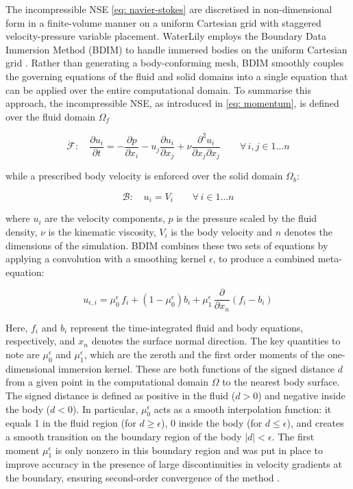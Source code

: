 The incompressible NSE \ref{eq: navier-stokes} are discretised in non-dimensional form in a finite-volume manner on a uniform Cartesian grid with staggered velocity-pressure variable placement. WaterLily employs the Boundary Data Immersion Method (BDIM) to handle immersed bodies on the uniform Cartesian grid \cite{Maertens2015}. Rather than generating a body-conforming mesh, BDIM smoothly couples the governing equations of the fluid and solid domains into a single equation that can be applied over the entire computational domain. To summarise this approach, the incompressible NSE, as introduced in \autoref{eq: momentum}, is defined over the fluid domain $\Omega_{f}$

\begin{equation}\label{eq: WaterLilyMomentum}
    \dot{\mathcal{F}}: \quad \frac{\partial u_i}{\partial t} = -\frac{\partial p}{\partial x_i} - u_j \frac{\partial u_i}{\partial x_j} + \nu \frac{\partial^2 u_i}{\partial x_j \partial x_j} \qquad \forall\, i,j \in 1\ldots n
\end{equation}

while a prescribed body velocity is enforced over the solid domain $\Omega_b$:

\begin{equation}\label{eq: WaterLilyBodyVelocity}
    \mathcal{B}: \quad u_i = V_i \qquad \forall\, i \in 1\ldots n
\end{equation}

where $u_i$ are the velocity components, $p$ is the pressure scaled by the fluid density, $\nu$ is the kinematic viscosity, $V_i$ is the body velocity and $n$ denotes the dimensions of the simulation. BDIM combines these two sets of equations by applying a convolution with a smoothing kernel $\epsilon$, to produce a combined meta-equation: 

\begin{equation}\label{eq: WaterLilyVelocity}
    u_{\epsilon, i} = \mu_0^\epsilon \, f_i + \left(1 - \mu_0^\epsilon\right) b_i 
+ \mu_1^\epsilon \, \frac{\partial}{\partial x_n}\!\left(f_i - b_i\right)
\end{equation}

Here, $f_i$ and $b_i$ represent the time-integrated fluid and body equations, respectively, and $x_n$ denotes the surface normal direction. The key quantities to note are $\mu^{\epsilon}_0$ and $\mu^{\epsilon}_1$, which are the zeroth and the first order moments of the one-dimensional immersion kernel. These are both functions of the signed distance $d$ from a given point in the computational domain $\Omega$ to the nearest body surface. The signed distance is defined as positive in the fluid ($d > 0$) and negative inside the body ($d < 0$). In particular, $\mu^{\epsilon}_0$ acts as a smooth interpolation function: it equals 1 in the fluid region (for $d \geq \epsilon$), 0 inside the body (for $d \leq \epsilon$), and creates a smooth transition on the boundary region of the body $|d| < \epsilon$. The first moment $\mu^{\epsilon}_1$ is only nonzero in this boundary region and was put in place to improve accuracy in the presence of large discontinuities in velocity gradients at the boundary, ensuring second-order convergence of the method \cite{Maertens2015}.

